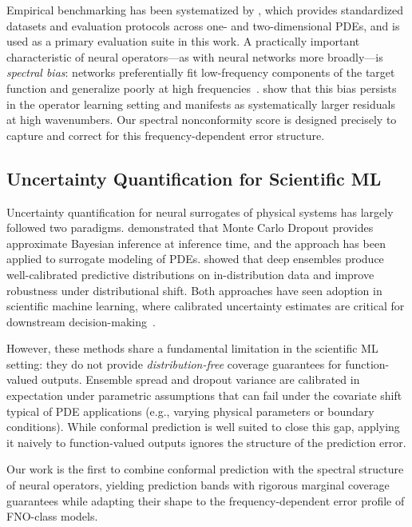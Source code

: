 Empirical benchmarking has been systematized by \citet{takamoto2022pdebench}, which provides standardized datasets and evaluation protocols across one- and two-dimensional PDEs, and is used as a primary evaluation suite in this work. A practically important characteristic of neural operators---as with neural networks more broadly---is \emph{spectral bias}: networks preferentially fit low-frequency components of the target function and generalize poorly at high frequencies~\citep{rahaman2019spectral}. \citet{fanaskov2023spectral} show that this bias persists in the operator learning setting and manifests as systematically larger residuals at high wavenumbers. Our spectral nonconformity score is designed precisely to capture and correct for this frequency-dependent error structure.

\subsection{Uncertainty Quantification for Scientific ML}

Uncertainty quantification for neural surrogates of physical systems has largely followed two paradigms. \citet{gal2016dropout} demonstrated that Monte Carlo Dropout provides approximate Bayesian inference at inference time, and the approach has been applied to surrogate modeling of PDEs. \citet{lakshminarayanan2017simple} showed that deep ensembles produce well-calibrated predictive distributions on in-distribution data and improve robustness under distributional shift. Both approaches have seen adoption in scientific machine learning, where calibrated uncertainty estimates are critical for downstream decision-making~\citep{kovachki2023neural}.

However, these methods share a fundamental limitation in the scientific ML setting: they do not provide \emph{distribution-free} coverage guarantees for function-valued outputs. Ensemble spread and dropout variance are calibrated in expectation under parametric assumptions that can fail under the covariate shift typical of PDE applications (e.g., varying physical parameters or boundary conditions). While conformal prediction is well suited to close this gap, applying it naively to function-valued outputs ignores the structure of the prediction error.

Our work is the first to combine conformal prediction with the spectral structure of neural operators, yielding prediction bands with rigorous marginal coverage guarantees while adapting their shape to the frequency-dependent error profile of FNO-class models.

